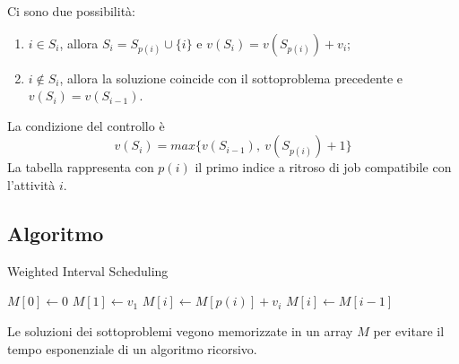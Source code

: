 Ci sono due possibilità:
\begin{enumerate}
	\item $i \in S_i$, allora $S_i = S_{p(i)} \cup \{i\}$ e $v(S_i) = v(S_{p(i)}) + v_i$;
	\item $i \notin S_i$, allora la soluzione coincide con il sottoproblema precedente e $v(S_i) = v(S_{i-1})$.
	\end{enumerate}
La condizione del controllo è
$$v(S_i) = max\{v(S_{i-1}),\:v(S_{p(i)}) + 1\}$$
La tabella rappresenta con $p(i)$ il primo indice a ritroso di job compatibile con l'attività $i$. 

\subsection{Algoritmo}

\begin{algorithm}[H]
	\caption{Weighted Interval Scheduling}
	\begin{algorithmic}
			\State $M[0] \gets 0$
			\State $M[1] \gets v_1$
					\State $M[i] \gets M[p(i)] + v_i$
				\Else
					\State $M[i] \gets M[i-1]$
				\EndIf
			\EndFor
		\EndFunction
	\end{algorithmic}
\end{algorithm}

Le soluzioni dei sottoproblemi vegono memorizzate in un array $M$ per evitare il tempo esponenziale di un algoritmo ricorsivo.